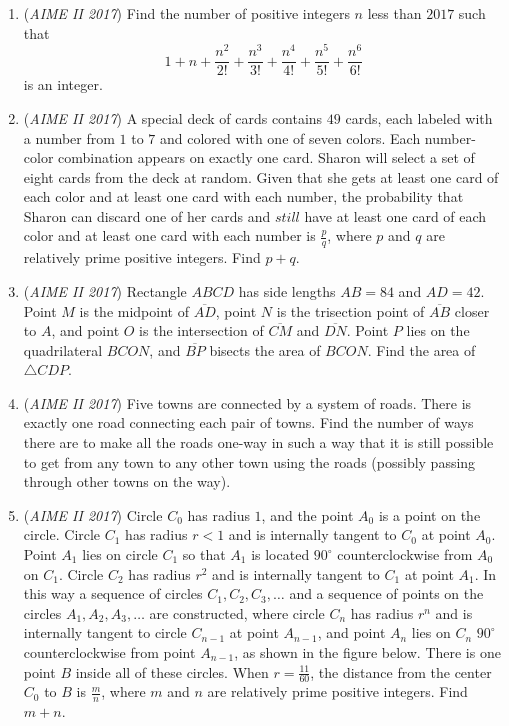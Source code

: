 \begin{enumerate}
 

	\item (\textit{AIME II 2017}) Find the number of positive integers $n$ less than $2017$ such that 
 \[1+n+\frac{n^2}{2!}+\frac{n^3}{3!}+\frac{n^4}{4!}+\frac{n^5}{5!}+\frac{n^6}{6!}\] is an integer.


 

	\item (\textit{AIME II 2017}) A special deck of cards contains $49$ cards, each labeled with a number from $1$ to $7$ and colored with one of seven colors. Each number-color combination appears on exactly one card. Sharon will select a set of eight cards from the deck at random. Given that she gets at least one card of each color and at least one card with each number, the probability that Sharon can discard one of her cards and $\textit{still}$ have at least one card of each color and at least one card with each number is $\frac{p}{q}$, where $p$ and $q$ are relatively prime positive integers. Find $p+q$.


 

	\item (\textit{AIME II 2017}) Rectangle $ABCD$ has side lengths $AB=84$ and $AD=42$. Point $M$ is the midpoint of $\overline{AD}$, point $N$ is the trisection point of $\overline{AB}$ closer to $A$, and point $O$ is the intersection of $\overline{CM}$ and $\overline{DN}$. Point $P$ lies on the quadrilateral $BCON$, and $\overline{BP}$ bisects the area of $BCON$. Find the area of $\triangle CDP$.


 

	\item (\textit{AIME II 2017}) Five towns are connected by a system of roads. There is exactly one road connecting each pair of towns. Find the number of ways there are to make all the roads one-way in such a way that it is still possible to get from any town to any other town using the roads (possibly passing through other towns on the way).


 

	\item (\textit{AIME II 2017}) Circle $C_0$ has radius $1$, and the point $A_0$ is a point on the circle. Circle $C_1$ has radius $r<1$ and is internally tangent to $C_0$ at point $A_0$. Point $A_1$ lies on circle $C_1$ so that $A_1$ is located $90^{\circ}$ counterclockwise from $A_0$ on $C_1$. Circle $C_2$ has radius $r^2$ and is internally tangent to $C_1$ at point $A_1$. In this way a sequence of circles $C_1,C_2,C_3,\ldots$ and a sequence of points on the circles $A_1,A_2,A_3,\ldots$ are constructed, where circle $C_n$ has radius $r^n$ and is internally tangent to circle $C_{n-1}$ at point $A_{n-1}$, and point $A_n$ lies on $C_n$ $90^{\circ}$ counterclockwise from point $A_{n-1}$, as shown in the figure below. There is one point $B$ inside all of these circles. When $r = \frac{11}{60}$, the distance from the center $C_0$ to $B$ is $\frac{m}{n}$, where $m$ and $n$ are relatively prime positive integers. Find $m+n$.



\end{enumerate}
